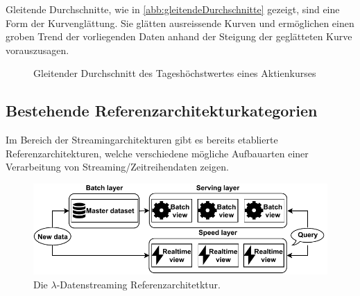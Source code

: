 Gleitende Durchschnitte, wie in \autoref{abb:gleitendeDurchschnitte} gezeigt, sind eine Form der Kurvenglättung. Sie glätten ausreissende Kurven und ermöglichen einen groben Trend der vorliegenden Daten anhand der Steigung der geglätteten Kurve vorauszusagen.
\begin{figure}[H]
\centering
{}
\caption{Gleitender Durchschnitt des Tageshöchstwertes eines Aktienkurses}
\label{abb:gleitendeDurchschnitte}
\end{figure}

\subsection{Bestehende Referenzarchitekturkategorien}\label{chap:bestehende_ras}
Im Bereich der Streamingarchitekturen gibt es bereits etablierte Referenzarchitekturen, welche verschiedene mögliche Aufbauarten einer Verarbeitung von Streaming/Zeitreihendaten zeigen.

\begin{figure}[H]
\centering
\includegraphics[width=\textwidth]{graphics/Lambda-Reference-Architecture.pdf}
\caption[Die $\lambda$-Datenstreaming Referenzarchitetktur]{Die $\lambda$-Datenstreaming Referenzarchitetktur.\footnotemark}
\label{abb:LambdaStreaming}
\end{figure}

